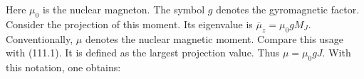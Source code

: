 Here $\mu_0$ is the nuclear magneton.
The symbol $g$ denotes the gyromagnetic factor.
Consider the projection of this moment.
Its eigenvalue is $\overline\mu_z=\mu_0gM_J$.
Conventionally, $\mu$ denotes the nuclear magnetic moment.
Compare this usage with (111.1).
It is defined as the largest projection value.
Thus $\mu=\mu_0gJ$.
With this notation, one obtains:

